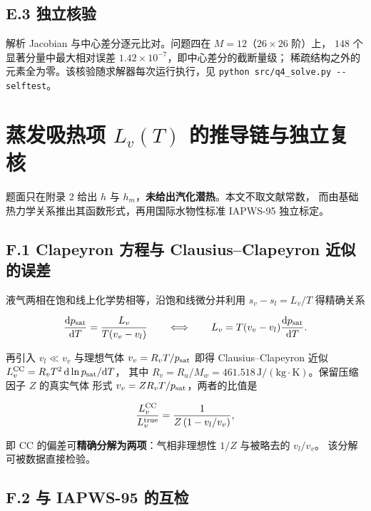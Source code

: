 \documentclass[withoutpreface,bwprint]{cumcmthesis} %
\begin{document}
\begin{appendices}
\subsection*{E.3 独立核验}

解析 Jacobian 与中心差分逐元比对。问题四在 $M=12$（$26\times26$ 阶）上，
$148$ 个显著分量中最大相对误差 $1.42\times10^{-7}$，即中心差分的截断量级；
稀疏结构之外的元素全为零。该核验随求解器每次运行执行，见
\texttt{python src/q4\_solve.py -{}-selftest}。

\section{蒸发吸热项 $L_v(T)$ 的推导链与独立复核}
\label{app:lv}

题面只在附录 2 给出 $h$ 与 $h_m$，\textbf{未给出汽化潜热}。本文不取文献常数，
而由基础热力学关系推出其函数形式，再用国际水物性标准 IAPWS-95 独立标定。

\subsection*{F.1 Clapeyron 方程与 Clausius--Clapeyron 近似的误差}

液气两相在饱和线上化学势相等，沿饱和线微分并利用 $s_v-s_l=L_v/T$ 得精确关系

\begin{equation}
\frac{\mathrm dp_{\rm sat}}{\mathrm dT}=\frac{L_v}{T(v_v-v_l)}
\qquad\Longleftrightarrow\qquad
L_v=T(v_v-v_l)\frac{\mathrm dp_{\rm sat}}{\mathrm dT}.
\end{equation}

再引入 $v_l\ll v_v$ 与理想气体 $v_v=R_vT/p_{\rm sat}$ 即得
Clausius--Clapeyron 近似 $L_v^{\rm CC}=R_vT^2\,\mathrm d\ln p_{\rm sat}/\mathrm dT$，
其中 $R_v=R_u/M_w=461.518\,\mathrm{J/(kg\cdot K)}$。保留压缩因子 $Z$ 的真实气体
形式 $v_v=ZR_vT/p_{\rm sat}$，两者的比值是

\begin{equation}
\frac{L_v^{\rm CC}}{L_v^{\rm true}}=\frac{1}{Z\,(1-v_l/v_v)},
\end{equation}

即 CC 的偏差可\textbf{精确分解为两项}：气相非理想性 $1/Z$ 与被略去的 $v_l/v_v$。
该分解可被数据直接检验。

\subsection*{F.2 与 IAPWS-95 的互检}


\end{appendices}
\end{document}

